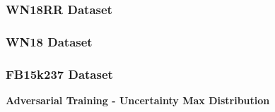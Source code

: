 \subsubsection{WN18RR Dataset}

\subsubsection{WN18 Dataset}

\subsubsection{FB15k237 Dataset}





\textbf{Adversarial Training - Uncertainty Max Distribution}\\
